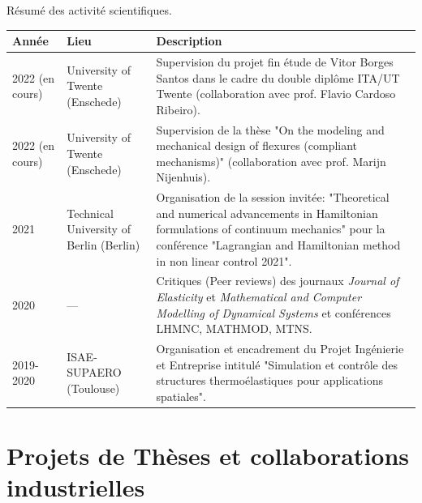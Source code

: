 \documentclass[aspectratio=169, french]{beamer}
\begin{document}
\begin{frame}{Résumé des activité scientifiques.}
	\small
	\begin{table}
		\centering
		\begin{tabular}{p{}p{}p{}}
			\hline
			Année & Lieu & Description  \\
			\hline
			2022 (en cours) & University of Twente (Enschede) & Supervision du projet fin étude de Vitor Borges Santos dans le cadre du double diplôme ITA/UT Twente (collaboration avec prof. Flavio Cardoso Ribeiro). \\
			2022 (en cours) & University of Twente (Enschede) & Supervision de la thèse "On the modeling and mechanical design of flexures (compliant mechanisms)" (collaboration avec prof. Marijn Nijenhuis). \\
			\hline
			2021  & Technical University of Berlin (Berlin) & Organisation de la session invitée: "Theoretical and numerical advancements in Hamiltonian formulations of continuum mechanics" pour la conférence "Lagrangian and Hamiltonian method in non linear control 2021". \\
			\hline
			2020 & --- & Critiques (Peer reviews) des journaux \textit{Journal of Elasticity} et \textit{Mathematical and Computer Modelling of Dynamical Systems} et conférences LHMNC, MATHMOD, MTNS. \\
			\hline
			2019-2020 & ISAE-SUPAERO (Toulouse) & Organisation et encadrement du Projet Ingénierie et Entreprise intitulé "Simulation et contrôle des structures thermoélastiques pour
			applications spatiales". \\
			\hline
		\end{tabular}

		\label{tab:activites}
	\end{table}
\end{frame}

\section{Projets de Thèses et collaborations industrielles}
\end{document}
